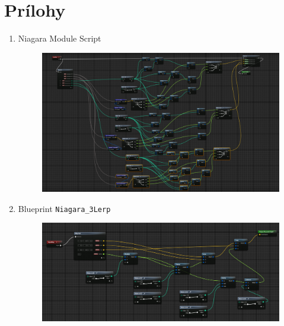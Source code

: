 \section*{Prílohy}
\begin{enumerate}[leftmargin=*]
    \item Niagara Module Script \label{att:nms}
    \begin{figure}[!htbp]
        \centering
        \includegraphics[width=21cm,angle=90,origin=c]{img/nms.png}
    \end{figure}
    \newpage

    \item Blueprint \texttt{Niagara\_3Lerp} \label{att:lerp}
    \begin{figure}[!htbp]
        \centering
        \includegraphics[width=22cm,angle=90,origin=c]{img/3lerp.png}
    \end{figure}
    \newpage


\end{enumerate}
